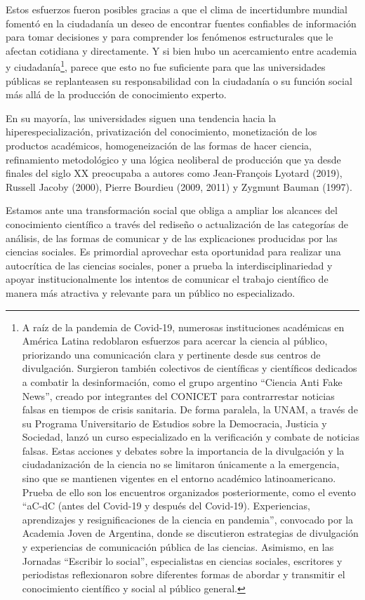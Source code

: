 \documentclass[
]{interact}
\begin{document}
Estos esfuerzos fueron posibles gracias a que el clima de incertidumbre
mundial fomentó en la ciudadanía un deseo de encontrar fuentes
confiables de información para tomar decisiones y para comprender los
fenómenos estructurales que le afectan cotidiana y directamente. Y si
bien hubo un acercamiento entre academia y ciudadanía\footnote{A raíz de
  la pandemia de Covid-19, numerosas instituciones académicas en América
  Latina redoblaron esfuerzos para acercar la ciencia al público,
  priorizando una comunicación clara y pertinente desde sus centros de
  divulgación. Surgieron también colectivos de científicas y científicos
  dedicados a combatir la desinformación, como el grupo argentino
  ``Ciencia Anti Fake News'', creado por integrantes del CONICET para
  contrarrestar noticias falsas en tiempos de crisis sanitaria. De forma
  paralela, la UNAM, a través de su Programa Universitario de Estudios
  sobre la Democracia, Justicia y Sociedad, lanzó un curso especializado
  en la verificación y combate de noticias falsas. Estas acciones y
  debates sobre la importancia de la divulgación y la ciudadanización de
  la ciencia no se limitaron únicamente a la emergencia, sino que se
  mantienen vigentes en el entorno académico latinoamericano. Prueba de
  ello son los encuentros organizados posteriormente, como el evento
  ``aC-dC (antes del Covid-19 y después del Covid-19). Experiencias,
  aprendizajes y resignificaciones de la ciencia en pandemia'',
  convocado por la Academia Joven de Argentina, donde se discutieron
  estrategias de divulgación y experiencias de comunicación pública de
  las ciencias. Asimismo, en las Jornadas ``Escribir lo social'',
  especialistas en ciencias sociales, escritores y periodistas
  reflexionaron sobre diferentes formas de abordar y transmitir el
  conocimiento científico y social al público general.}, parece que esto
no fue suficiente para que las universidades públicas se replanteasen su
responsabilidad con la ciudadanía o su función social más allá de la
producción de conocimiento experto.

En su mayoría, las universidades siguen una tendencia hacia la
hiperespecialización, privatización del conocimiento, monetización de
los productos académicos, homogeneización de las formas de hacer
ciencia, refinamiento metodológico y una lógica neoliberal de producción
que ya desde finales del siglo XX preocupaba a autores como
Jean-François Lyotard (2019), Russell Jacoby (2000), Pierre Bourdieu
(2009, 2011) y Zygmunt Bauman (1997).

Estamos ante una transformación social que obliga a ampliar los alcances
del conocimiento científico a través del rediseño o actualización de las
categorías de análisis, de las formas de comunicar y de las
explicaciones producidas por las ciencias sociales. Es primordial
aprovechar esta oportunidad para realizar una autocrítica de las
ciencias sociales, poner a prueba la interdisciplinariedad y apoyar
institucionalmente los intentos de comunicar el trabajo científico de
manera más atractiva y relevante para un público no especializado.
\end{document}
